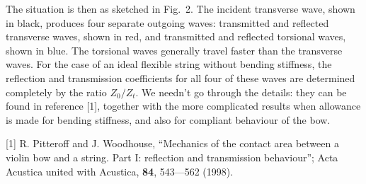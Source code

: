   The situation is then as sketched in Fig.\ 2. The incident transverse wave, 
  shown in black, produces four separate outgoing waves: transmitted and 
  reflected transverse waves, shown in red, and transmitted and reflected 
  torsional waves, shown in blue. The torsional waves generally travel faster 
  than the transverse waves. For the case of an ideal flexible string without 
  bending stiffness, the reflection and transmission coefficients for all four 
  of these waves are determined completely by the ratio $Z_0/Z_t$. We needn't 
  go through the details: they can be found in reference [1], together with the 
  more complicated results when allowance is made for bending stiffness, and 
  also for compliant behaviour of the bow. 


  \sectionreferences{}[1] R. Pitteroff and J. Woodhouse, “Mechanics of the 
  contact area between a violin bow and a string. Part I: reflection and 
  transmission behaviour”; Acta Acustica united with Acustica, \textbf{84}, 
  543—562 (1998). 